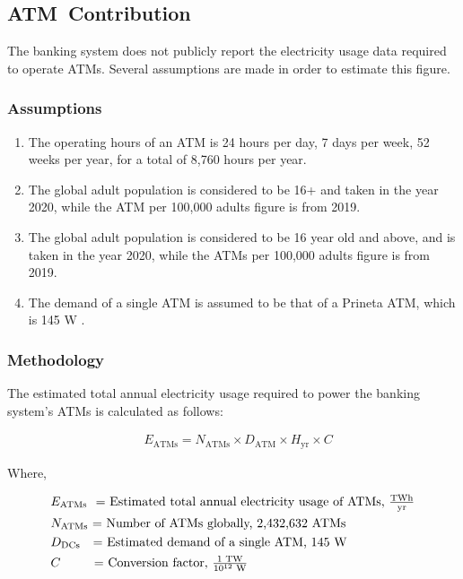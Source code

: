 \subsection{ATM Contribution}\label{section:banks-atm}
The banking system does not publicly report the electricity usage data required to operate ATMs.
Several assumptions are made in order to estimate this figure.

\subsubsection{Assumptions}
\begin{enumerate}
  \item The operating hours of an ATM is 24 hours per day, 7 days per week, 52 weeks per year, for a total of 8,760 hours per year.
  \item The global adult population is considered to be 16+ and taken in the year 2020, while the ATM per 100,000 adults figure is from 2019.
  \item The global adult population is considered to be 16 year old and above, and is taken in the year 2020, while the ATMs per 100,000 adults figure is from 2019.
  \item The demand of a single ATM is assumed to be that of a Prineta ATM, which is 145 W \cite{rating-atm}.
\end{enumerate}

\subsubsection{Methodology}
The estimated total annual electricity usage required to power the banking system's ATMs is calculated as follows:

\begin{align}\label{eqn:banks-e-atms}
&E_\textrm{ATMs} = N_\textrm{ATMs} \times D_\textrm{ATM} \times H_\textrm{yr} \times C
\end{align}

Where,

\begin{align*}
  &E_\textrm{ATMs} \textrm{ \   = Estimated total annual electricity usage of ATMs, } \tfrac{ \textrm{{T}Wh} } { \textrm{yr} } \\
  &N_\textrm{ATMs} \textrm{     = Number of ATMs globally,  2,432,632 ATMs} \\
  &D_\textrm{DCs} \textrm{ \ \  = Estimated demand of a single ATM, 145 W} \\
  &C \textrm{\qquad \ \         = Conversion factor, $\tfrac{1 \textrm{ TW} } { 10^{12} \textrm{ W}}$}
\end{align*}

